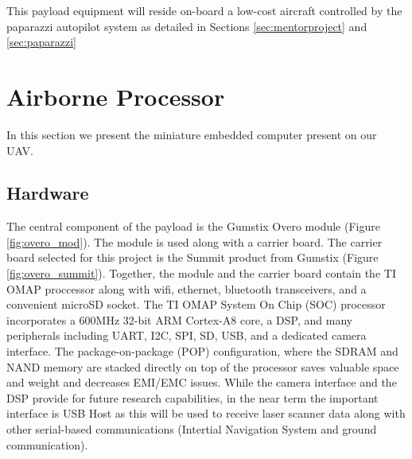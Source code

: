 \documentclass[a4paper,11pt]{report}
\begin{document}
This payload equipment will reside on-board a low-cost aircraft controlled by the paparazzi autopilot system as detailed in Sections \ref{sec:mentorproject} and \ref{sec:paparazzi}

\section{Airborne Processor}
\label{sec:AirborneProcessor}

In this section we present the miniature embedded computer present on our UAV.

\subsection{Hardware}

The central component of the payload is the Gumstix Overo module (Figure \ref{fig:overo_mod}). The module is used along with a carrier board. The carrier board selected for this project is the Summit product from Gumstix (Figure \ref{fig:overo_summit}). Together, the module and the carrier board contain the TI OMAP proccessor along with wifi, ethernet, bluetooth transceivers, and a convenient microSD socket. The TI OMAP System On Chip (SOC) processor incorporates a 600MHz 32-bit ARM Cortex-A8 core, a DSP, and many peripherals including UART, I2C, SPI, SD, USB, and a dedicated camera interface. The package-on-package (POP) configuration, where the SDRAM and NAND memory are stacked directly on top of the processor saves valuable space and weight and decreases EMI/EMC issues. While the camera interface and the DSP provide for future research capabilities, in the near term the important interface is USB Host as this will be used to receive laser scanner data along with other serial-based communications (Intertial Navigation System and ground communication).
\end{document}
